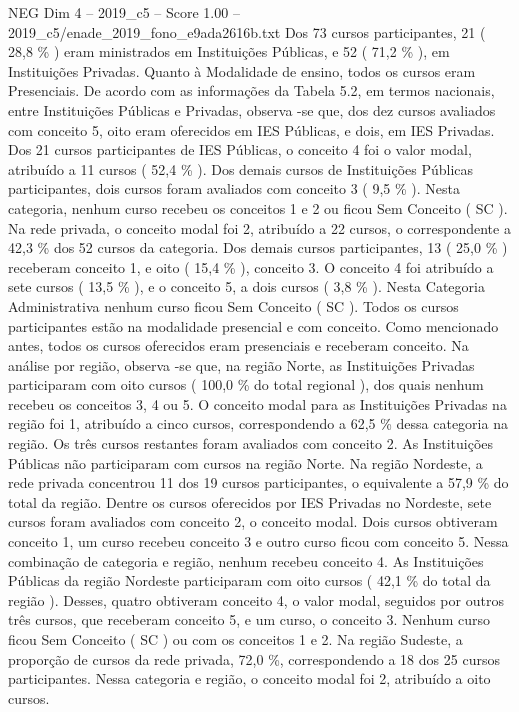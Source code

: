 \begin{textsample}{NEG Dim 4 – 2019\_c5 – Score 1.00 – 2019\_c5/enade\_2019\_fono\_e9ada2616b.txt}
Dos 73 cursos participantes, 21 ( 28,8 \% ) eram ministrados em Instituições Públicas, e 52 ( 71,2 \% ), em Instituições Privadas.
Quanto à Modalidade de ensino, todos os cursos eram Presenciais.
De acordo com as informações da Tabela 5.2, em termos nacionais, entre Instituições Públicas e Privadas, observa -se que, dos dez cursos avaliados com conceito 5, oito eram oferecidos em IES Públicas, e dois, em IES Privadas.
Dos 21 cursos participantes de IES Públicas, o conceito 4 foi o valor modal, atribuído a 11 cursos ( 52,4 \% ).
Dos demais cursos de Instituições Públicas participantes, dois cursos foram avaliados com conceito 3 ( 9,5 \% ).
Nesta categoria, nenhum curso recebeu os conceitos 1 e 2 ou ficou Sem Conceito ( SC ).
Na rede privada, o conceito modal foi 2, atribuído a 22 cursos, o correspondente a 42,3 \% dos 52 cursos da categoria.
Dos demais cursos participantes, 13 ( 25,0 \% ) receberam conceito 1, e oito ( 15,4 \% ), conceito 3.
O conceito 4 foi atribuído a sete cursos ( 13,5 \% ), e o conceito 5, a dois cursos ( 3,8 \% ).
Nesta Categoria Administrativa nenhum curso ficou Sem Conceito ( SC ).
Todos os cursos participantes estão na modalidade presencial e com conceito.
Como mencionado antes, todos os cursos oferecidos eram presenciais e receberam conceito.
Na análise por região, observa -se que, na região Norte, as Instituições Privadas participaram com oito cursos ( 100,0 \% do total regional ), dos quais nenhum recebeu os conceitos 3, 4 ou 5.
O conceito modal para as Instituições Privadas na região foi 1, atribuído a cinco cursos, correspondendo a 62,5 \% dessa categoria na região.
Os três cursos restantes foram avaliados com conceito 2.
As Instituições Públicas não participaram com cursos na região Norte.
Na região Nordeste, a rede privada concentrou 11 dos 19 cursos participantes, o equivalente a 57,9 \% do total da região.
Dentre os cursos oferecidos por IES Privadas no Nordeste, sete cursos foram avaliados com conceito 2, o conceito modal.
Dois cursos obtiveram conceito 1, um curso recebeu conceito 3 e outro curso ficou com conceito 5.
Nessa combinação de categoria e região, nenhum recebeu conceito 4.
As Instituições Públicas da região Nordeste participaram com oito cursos ( 42,1 \% do total da região ).
Desses, quatro obtiveram conceito 4, o valor modal, seguidos por outros três cursos, que receberam conceito 5, e um curso, o conceito 3.
Nenhum curso ficou Sem Conceito ( SC ) ou com os conceitos 1 e 2.
Na região Sudeste, a proporção de cursos da rede privada, 72,0 \%, correspondendo a 18 dos 25 cursos participantes.
Nessa categoria e região, o conceito modal foi 2, atribuído a oito cursos.

\end{textsample}
